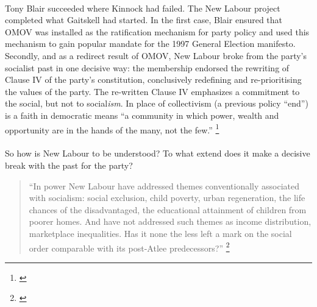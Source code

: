 \documentclass[13pt]{article}
\begin{document}
\begin{onehalfspace}
\paragraph{}Tony Blair succeeded where Kinnock had failed. The New Labour project completed what Gaitskell had started. In the first case, Blair ensured that OMOV was installed as the ratification mechanism for party policy and used this mechanism to gain popular mandate for the 1997 General Election manifesto. Secondly, and as a redirect result of OMOV, New Labour broke from the party's socialist past in one decisive way: the membership endorsed the rewriting of Clause IV of the party's constitution, conclusively redefining and re-prioritising the values of the party. The re-written Clause IV emphasizes a commitment to the social, but not to social\emph{ism}. In place of collectivism (a previous policy ``end'') is a faith in democratic means ``a community in which power, wealth and opportunity are in the hands of the many, not the few.'' \footnote{\cite[website]{Labour:2007yq}}

\paragraph{}So how is New Labour to be understood? To what extend does it make a decisive break with the past for the party?
\begin{quote}
``In power New Labour have addressed themes conventionally associated with socialism: social exclusion, child poverty, urban regeneration, the life chances of the disadvantaged, the educational attainment of children from poorer homes. And have not addressed such themes as income distribution, marketplace inequalities. Has it none the less left a mark on the social order comparable with its post-Atlee predecessors?'' \footnote{\cite[pp. 271]{Toynbee:2004fk}}
\end{quote}


\end{onehalfspace}
\end{document}
